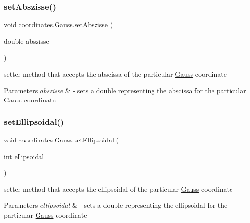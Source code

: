\subsubsection{\texorpdfstring{set\+Abszisse()}{setAbszisse()}}
{\footnotesize\ttfamily void coordinates.\+Gauss.\+set\+Abszisse (\begin{DoxyParamCaption}\item[{double}]{abszisse }\end{DoxyParamCaption})}



setter method that accepts the abscissa of the particular \hyperlink{classcoordinates_1_1_gauss}{Gauss} coordinate 


\begin{DoxyParams}{Parameters}
{\em abszisse} & -\/ sets a double representing the abscissa for the particular \hyperlink{classcoordinates_1_1_gauss}{Gauss} coordinate \\
\hline
\end{DoxyParams}
\mbox{\label{classcoordinates_1_1_gauss_a2bfa95e5913df58667cf5c15db228db8}} 
\subsubsection{\texorpdfstring{set\+Ellipsoidal()}{setEllipsoidal()}}
{\footnotesize\ttfamily void coordinates.\+Gauss.\+set\+Ellipsoidal (\begin{DoxyParamCaption}\item[{int}]{ellipsoidal }\end{DoxyParamCaption})}



setter method that accepts the ellipsoidal of the particular \hyperlink{classcoordinates_1_1_gauss}{Gauss} coordinate 


\begin{DoxyParams}{Parameters}
{\em ellipsoidal} & -\/ sets a double representing the ellipsoidal for the particular \hyperlink{classcoordinates_1_1_gauss}{Gauss} coordinate \\
\hline
\end{DoxyParams}
\mbox{\label{classcoordinates_1_1_gauss_a3af44a951b3cb9ea5f5cf143b1cb2253}} 
